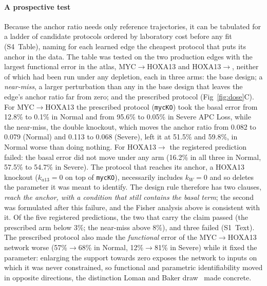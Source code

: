 \paragraph{A prospective test} Because the anchor ratio needs only reference
trajectories, it can be tabulated for a ladder of candidate protocols ordered by
laboratory cost before any fit (S4~Table), naming for each learned edge the
cheapest protocol that puts its anchor in the data. The table was tested on the
two production edges with the largest functional error in the atlas, MYC$\to$HOXA13
and HOXA13$\to$\bcat{}, neither of which had been run under any depletion, each
in three arms: the base design; a \emph{near-miss}, a larger perturbation than
any in the base design that leaves the edge's anchor ratio far from zero; and
the prescribed protocol (Fig~\ref{fig:dose}C). For MYC$\to$HOXA13 the prescribed
protocol (\texttt{mycKO}) took the basal error from 12.8\% to 0.1\% in Normal
and from 95.6\% to 0.05\% in Severe APC Loss, while the near-miss, the \bcat{}
double knockout, which moves the anchor ratio from 0.082 to 0.079 (Normal) and
0.113 to 0.068 (Severe), left it at 51.5\% and 59.8\%, in Normal worse than
doing nothing. For HOXA13$\to$\bcat{} the registered prediction failed: the
basal error did not move under any arm (16.2\% in all three in Normal, 57.5\%
to 54.7\% in Severe). The protocol that reaches its anchor, a HOXA13 knockout
($k_{a13}=0$ on top of \texttt{mycKO}), necessarily includes $k_W=0$ and so
deletes the parameter it was meant to identify. The design rule therefore has
two clauses, \emph{reach the anchor, with a condition that still contains the
basal term}; the second was formulated after this failure, and the Fisher
analysis above is consistent with it. Of the five registered predictions, the two
that carry the claim passed (the prescribed arm below 3\%; the near-miss above
8\%), and three failed (S1~Text). The prescribed protocol also made the
\emph{functional} error of the MYC$\to$HOXA13 network worse (57\%$\to$68\% in
Normal, 12\%$\to$81\% in Severe) while it fixed the parameter: enlarging the
support towards zero exposes the network to inputs on which it was never
constrained, so functional and parametric identifiability moved in opposite
directions, the distinction Loman and Baker draw~\citep{loman2025identifiability}
made concrete.


